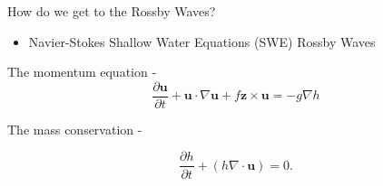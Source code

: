 \documentclass[12pt]{beamer}
\newcommand{\partiald}[2]{\frac{\partial {#1} }{\partial {#2}}}
\begin{document}
\begin{frame}{How do we get to the Rossby Waves?}

\begin{itemize}
\item Navier-Stokes \MVRightarrow  Shallow Water Equations (SWE) \MVRightarrow  Rossby Waves
\end{itemize}

\vspace{15pt}


The momentum equation -
\begin{equation}
\frac{\partial{\textbf{u}}}{\partial{t}} + \textbf{u}\cdot\nabla\textbf{u} + f \textbf{z} \times \textbf{u} = -g \nabla h
\end{equation}

The mass conservation - 

\begin{equation}
\partiald{h}{t} + (h\nabla\cdot \textbf{u}) = 0.
\end{equation}
\end{frame}
%
%
%
%
%
%
%
%
%
\end{document}
